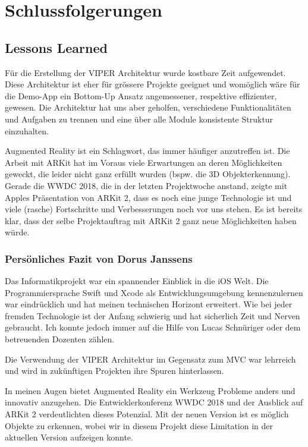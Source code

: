 \section{Schlussfolgerungen}

\subsection{Lessons Learned}

Für die Erstellung der VIPER Architektur wurde kostbare Zeit aufgewendet.
Diese Architektur ist eher für grössere Projekte geeignet und womöglich wäre für die Demo-App ein Bottom-Up Ansatz angemessener, respektive effizienter, gewesen.
Die Architektur hat uns aber geholfen, verschiedene Funktionalitäten und Aufgaben zu trennen und eine über alle Module konsistente Struktur einzuhalten.

Augmented Reality ist ein Schlagwort, das immer häufiger anzutreffen ist.
Die Arbeit mit ARKit hat im Voraus viele Erwartungen an deren Möglichkeiten geweckt, die leider nicht ganz erfüllt wurden (bspw. die 3D Objekterkennung).
Gerade die WWDC 2018, die in der letzten Projektwoche anstand, zeigte mit Apples Präsentation von ARKit 2, dass es noch eine junge Technologie ist und viele (rasche) Fortschritte und Verbesserungen noch vor uns stehen.
Es ist bereits klar, dass der selbe Projektauftrag mit ARKit 2 ganz neue Möglichkeiten haben würde.

\subsubsection{Persönliches Fazit von Dorus Janssens}
Das Informatikprojekt war ein spannender Einblick in die iOS Welt. Die Programmiersprache Swift und Xcode als Entwicklungsumgebung kennenzulernen war eindrücklich und hat meinen technischen Horizont erweitert. Wie bei jeder fremden Technologie ist der Anfang schwierig und hat sicherlich Zeit und Nerven gebraucht. Ich konnte jedoch immer auf die Hilfe von Lucas Schnüriger oder dem betreuenden Dozenten zählen.

Die Verwendung der VIPER Architektur im Gegensatz zum MVC war lehrreich und wird in zukünftigen Projekten ihre Spuren hinterlassen.

In meinen Augen bietet Augmented Reality ein Werkzeug Probleme anders und innovativ anzugehen. Die Entwicklerkonferenz WWDC 2018 und der Ausblick auf ARKit 2 verdeutlichten dieses Potenzial. Mit der neuen Version ist es möglich Objekte zu erkennen, wobei wir in diesem Projekt diese Limitation in der aktuellen Version aufzeigen konnte. 

